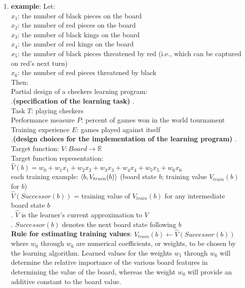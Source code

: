 \begin{enumerate}[itemsep=0.2cm]
    \item[] \textbf{example}: Let:
    \\
    $x_1$: the number of black pieces on the board 
    \\
    $x_2$: the number of red pieces on the board 
    \\
    $x_3$: the number of black kings on the board 
    \\
    $x_4$: the number of red kings on the board 
    \\
    $x_5$: the number of black pieces threatened by red (i.e., which can be captured on red's next turn) 
    \\
    $x_6$: the number of red pieces threatened by black 
    \vspace{0.3cm} \noindent
    \\
    Then: 
    \\
    Partial design of a checkers learning program: 
    \\
    .\hfill \textbf{(specification of the learning task)} \hfill.
    \\
    Task $T$: playing checkers 
    \\
    Performance measure $P$: percent of games won in the world tournament 
    \\
    Training experience $E$: games played against itself 
    \\
    .\hfill \textbf{(design choices for the implementation of the learning program)} \hfill.
    \\
    Target function: $V: Board \to \mathbb{R}$ 
    \\
    Target function representation: $\hat{V}(b) = w_0 + w_1x_1 + w_2x_2 + w_3x_3 + w_4x_4 + w_5x_5 + w_6x_6$ 
    \\
    each training example: $\left< b, V_{train}(b)\right >$
        \hfill (board state $b$; training value $V_{train}(b)$ for $b$)
    \\
    $\hat{V}(Successor(b))$ = training value of $V_{train}(b)$ for any intermediate board state $b$
    \\
    .\hspace{1cm} $\hat{V}$ is the learner's current approximation to $V$
    \\
    .\hspace{1cm} $Successor(b)$ denotes the next board state following $b$
    \vspace{0.3cm} \noindent
    \\
    \textbf{Rule for estimating training values}: $V_{train}(b) \gets \hat{V}(Successor(b))$
    \vspace{0.3cm} \noindent
    \\
    where $w_0$ through $w_6$ are numerical coefficients, or weights, to be chosen by the learning algorithm. Learned values for the weights $w_1$ through $w_6$ will determine the relative importance of the various board features in determining the value of the board, whereas the weight $w_0$ will provide an additive constant to the board value. 
\end{enumerate}
